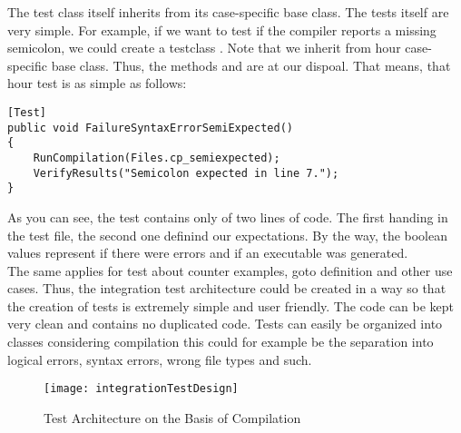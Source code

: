 The test class itself inherits from its case-specific base class. The tests itself are very simple. For example, if we want to test if the compiler reports a missing semicolon, we could create a testclass . Note that we inherit from hour case-specific base class. Thus, the methods  and are at our dispoal. That means, that hour test is as simple as follows:
\begin{lstlisting}[caption={Sample Test for Missing Semicolon}, captionpos=b, label={lst:demoTest}]
[Test]
public void FailureSyntaxErrorSemiExpected()
{
    RunCompilation(Files.cp_semiexpected);
    VerifyResults("Semicolon expected in line 7.");
}
\end{lstlisting}
As you can see, the test contains only of two lines of code. The first handing in the test file, the second one definind our expectations. By the way, the boolean values represent if there were errors and if an executable was generated.\\
The same applies for test about counter examples, goto definition and other use cases. Thus, the integration test architecture could be created in a way so that the creation of tests is extremely simple and user friendly. The code can be kept very clean and contains no duplicated code. Tests can easily be organized into classes \textendash{} considering compilation this could for example be the separation into logical errors, syntax errors, wrong file types and such.

\begin{figure}[h]
    \centering
    \texttt{[image: integrationTestDesign]}
    \caption{Test Architecture on the Basis of Compilation}
    \label{fig:testArchitecture}
\end{figure}








